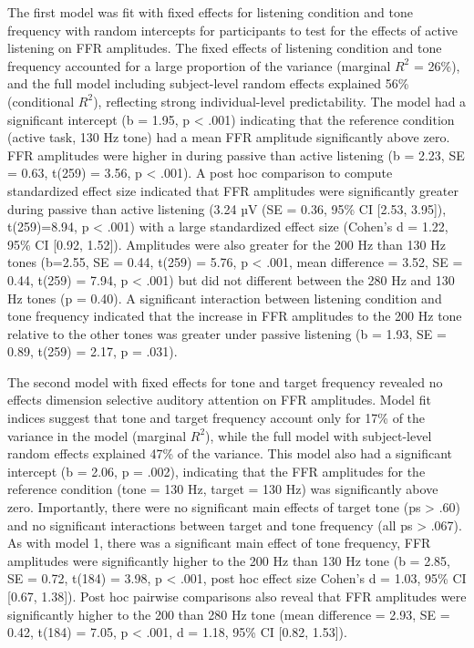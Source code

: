 The first model was fit with fixed effects for listening condition and tone frequency with random intercepts for participants to test for the effects of active listening on FFR amplitudes. The fixed effects of listening condition and tone frequency accounted for a large proportion of the variance (marginal $R^2$ = 26\%), and the full model including subject-level random effects explained 56\% (conditional $R^2$), reflecting strong individual-level predictability. The model had a significant intercept (b = 1.95, p < .001) indicating that the reference condition (active task, 130 Hz tone) had a mean FFR amplitude significantly above zero. FFR amplitudes were higher in during passive than active listening (b = 2.23, SE = 0.63, t(259) = 3.56, p < .001). A post hoc comparison to compute standardized effect size indicated that FFR amplitudes were significantly greater during passive than active listening (3.24 µV (SE = 0.36, 95\% CI [2.53, 3.95]), t(259)=8.94, p < .001) with a large standardized effect size (Cohen’s d = 1.22, 95\% CI [0.92, 1.52]). Amplitudes were also greater for the 200 Hz than 130 Hz tones (b=2.55, SE = 0.44, t(259) = 5.76, p < .001, mean difference = 3.52, SE = 0.44, t(259) = 7.94, p < .001) but did not different between the 280 Hz and 130 Hz tones (p = 0.40). A significant interaction between listening condition and tone frequency indicated that the increase in FFR amplitudes to the 200 Hz tone relative to the other tones was greater under passive listening (b = 1.93, SE = 0.89, t(259) = 2.17, p = .031). 

The second model with fixed effects for tone and target frequency revealed no effects dimension selective auditory attention on FFR amplitudes. Model fit indices suggest that tone and target frequency account only for 17\% of the variance in the model (marginal $R^2$), while the full model with subject-level random effects explained 47\% of the variance. This model also had a significant intercept (b = 2.06, p = .002), indicating that the FFR amplitudes for the reference condition (tone = 130 Hz, target = 130 Hz) was significantly above zero. Importantly, there were no significant main effects of target tone (ps > .60) and no significant interactions between target and tone frequency (all ps > .067). As with model 1, there was a significant main effect of tone frequency, FFR amplitudes were significantly higher to the 200 Hz than 130 Hz tone (b = 2.85, SE = 0.72, t(184) = 3.98, p < .001, post hoc effect size Cohen's d = 1.03, 95\% CI [0.67, 1.38]). Post hoc pairwise comparisons also reveal that FFR amplitudes were significantly higher to the 200 than 280 Hz tone (mean difference = 2.93, SE = 0.42, t(184) = 7.05, p < .001, d = 1.18, 95\% CI [0.82, 1.53]). 

